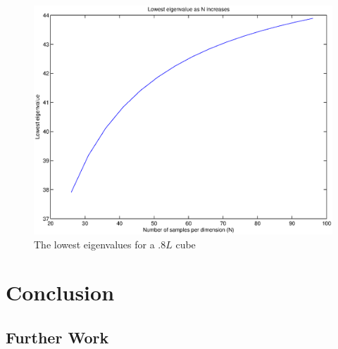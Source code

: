 \documentclass[authoryearcitations]{UoYCSproject}
\begin{document}
\begin{figure}
\centering
\includegraphics[scale=0.5]{figures/Mconverge.eps}
\caption{The lowest eigenvalues for a $.8L$ cube} 
\label{MconvergePlot}
\end{figure}


\chapter{Conclusion}



\section{Further Work}


\end{document}
